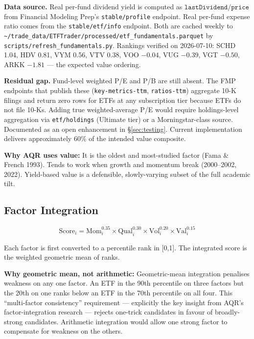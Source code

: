 \documentclass[11pt,a4paper]{article}
\begin{document}
\textbf{Data source.} Real per-fund dividend yield is computed as $\texttt{lastDividend} / \texttt{price}$ from Financial Modeling Prep's \texttt{stable/profile} endpoint. Real per-fund expense ratio comes from the \texttt{stable/etf/info} endpoint. Both are cached weekly to \texttt{\textasciitilde/trade\_data/ETFTrader/processed/etf\_fundamentals.parquet} by \texttt{scripts/refresh\_fundamentals.py}. Rankings verified on 2026-07-10: SCHD 1.04, HDV 0.81, VYM 0.56, VTV 0.38, VOO $-0.04$, VUG $-0.39$, VGT $-0.50$, ARKK $-1.81$ --- the expected value ordering.

\textbf{Residual gap.} Fund-level weighted P/E and P/B are still absent. The FMP endpoints that publish these (\texttt{key-metrics-ttm}, \texttt{ratios-ttm}) aggregate 10-K filings and return zero rows for ETFs at any subscription tier because ETFs do not file 10-Ks. Adding true weighted-average P/E would require holdings-level aggregation via \texttt{etf/holdings} (Ultimate tier) or a Morningstar-class source. Documented as an open enhancement in \S\ref{sec:testing}. Current implementation delivers approximately 60\% of the intended value composite.

\textbf{Why AQR uses value:} It is the oldest and most-studied factor (Fama \& French 1993). Tends to work when growth and momentum break (2000--2002, 2022). Yield-based value is a defensible, slowly-varying subset of the full academic tilt.

\subsection{Factor Integration}

\begin{equation}
\text{Score}_i = \text{Mom}_i^{0.35} \times \text{Qual}_i^{0.30} \times \text{Vol}_i^{0.20} \times \text{Val}_i^{0.15}
\end{equation}

Each factor is first converted to a percentile rank in [0,1]. The integrated score is the weighted geometric mean of ranks.

\textbf{Why geometric mean, not arithmetic:} Geometric-mean integration penalises weakness on any one factor. An ETF in the 90th percentile on three factors but the 20th on one ranks below an ETF in the 70th percentile on all four. This ``multi-factor consistency'' requirement --- explicitly the key insight from AQR's factor-integration research --- rejects one-trick candidates in favour of broadly-strong candidates. Arithmetic integration would allow one strong factor to compensate for weakness on the others.
\end{document}

